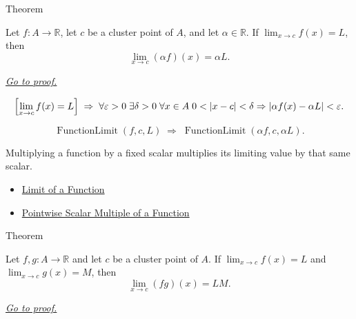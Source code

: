 
\begin{theorembox}{Theorem}
\begin{theorem}
\label{thm:limit-scalar-multiple}
Let $f:A\to\mathbb{R}$, let $c$ be a cluster point of $A$, and let
$\alpha\in\mathbb{R}$. If $\lim_{x\to c}f(x)=L$, then
\[
  \lim_{x\to c}(\alpha f)(x)=\alpha L.
\]

\smallskip\noindent
\hyperref[prf:limit-scalar-multiple]{\textit{Go to proof.}}
\end{theorem}
\end{theorembox}

\begin{remark*}
\[
  \Bigl[\lim_{x\to c}f(x)=L\Bigr]
  \;\Rightarrow\;
  \forall\varepsilon>0\;\exists\delta>0\;\forall x\in A\;
  0<|x-c|<\delta\Rightarrow |\alpha f(x)-\alpha L|<\varepsilon.
\]
\end{remark*}

\begin{remark*}
\[
  \operatorname{FunctionLimit}(f,c,L)
  \;\Longrightarrow\;
  \operatorname{FunctionLimit}(\alpha f,c,\alpha L).
\]
\end{remark*}

\begin{remark*}[Interpretation]
Multiplying a function by a fixed scalar multiplies its limiting value by
that same scalar.
\end{remark*}

\begin{dependencies}
\begin{itemize}
  \item \hyperref[def:limit-function]{Limit of a Function}
  \item \hyperref[def:pointwise-scalar-multiple-of-a-function]{Pointwise Scalar Multiple of a Function}
\end{itemize}
\end{dependencies}


\begin{theorembox}{Theorem}
\begin{theorem}
\label{thm:limit-product}
Let $f,g:A\to\mathbb{R}$ and let $c$ be a cluster point of $A$. If
$\lim_{x\to c}f(x)=L$ and $\lim_{x\to c}g(x)=M$, then
\[
  \lim_{x\to c}(fg)(x)=LM.
\]

\smallskip\noindent
\hyperref[prf:limit-product]{\textit{Go to proof.}}
\end{theorem}
\end{theorembox}

